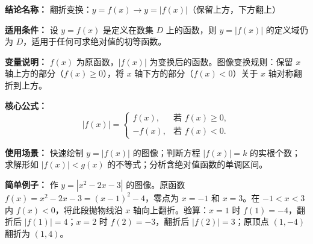 \textbf{结论名称：} 翻折变换：$y=f(x)\to y=|f(x)|$（保留上方，下方翻上）

\textbf{适用条件：} 设 $y=f(x)$ 是定义在数集 $D$ 上的函数，则 $y=|f(x)|$ 的定义域仍为 $D$，适用于任何可求绝对值的初等函数。

\textbf{变量说明：} $f(x)$ 为原函数，$|f(x)|$ 为变换后的函数。图像变换规则：保留 $x$ 轴上方的部分（$f(x)\ge 0$），将 $x$ 轴下方的部分（$f(x)<0$）关于 $x$ 轴对称翻折到上方。

\textbf{核心公式：}
\[
\boxed{|f(x)| = 
\begin{cases}
f(x), & \text{若 } f(x) \ge 0,\\[2pt]
-f(x), & \text{若 } f(x) < 0.
\end{cases}}
\]

\textbf{使用场景：} 快速绘制 $y=|f(x)|$ 的图像；判断方程 $|f(x)|=k$ 的实根个数；求解形如 $|f(x)|<g(x)$ 的不等式；分析含绝对值函数的单调区间。

\textbf{简单例子：} 作 $y=|x^2-2x-3|$ 的图像。原函数 $f(x)=x^2-2x-3=(x-1)^2-4$，零点为 $x=-1$ 和 $x=3$。在 $-1<x<3$ 内 $f(x)<0$，将此段抛物线沿 $x$ 轴向上翻折。验算：$x=1$ 时 $f(1)=-4$，翻折后 $|f(1)|=4$；$x=2$ 时 $f(2)=-3$，翻折后 $|f(2)|=3$；原顶点 $(1,-4)$ 翻折为 $(1,4)$。